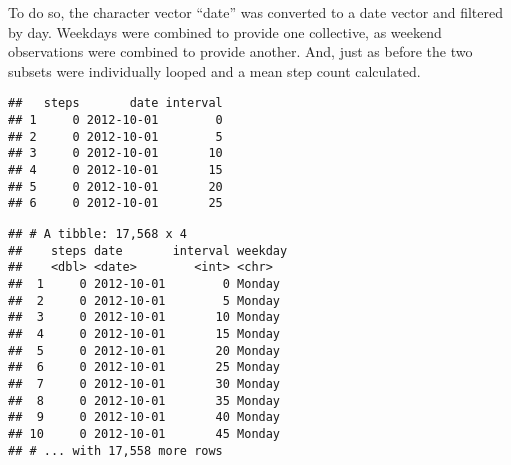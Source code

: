 \documentclass[]{article}
\newenvironment{Shaded}{\begin{snugshade}}{\end{snugshade}}
\newcommand{\KeywordTok}[1]{\textcolor[rgb]{0.13,0.29,0.53}{\textbf{#1}}}
\newcommand{\DataTypeTok}[1]{\textcolor[rgb]{0.13,0.29,0.53}{#1}}
\newcommand{\DecValTok}[1]{\textcolor[rgb]{0.00,0.00,0.81}{#1}}
\newcommand{\StringTok}[1]{\textcolor[rgb]{0.31,0.60,0.02}{#1}}
\newcommand{\OperatorTok}[1]{\textcolor[rgb]{0.81,0.36,0.00}{\textbf{#1}}}
\newcommand{\NormalTok}[1]{#1}
\begin{document}
To do so, the character vector ``date'' was converted to a date vector
and filtered by day. Weekdays were combined to provide one collective,
as weekend observations were combined to provide another. And, just as
before the two subsets were individually looped and a mean step count
calculated.

\begin{Shaded}
\end{Shaded}

\begin{verbatim}
##   steps       date interval
## 1     0 2012-10-01        0
## 2     0 2012-10-01        5
## 3     0 2012-10-01       10
## 4     0 2012-10-01       15
## 5     0 2012-10-01       20
## 6     0 2012-10-01       25
\end{verbatim}

\begin{Shaded}
\end{Shaded}

\begin{verbatim}
## # A tibble: 17,568 x 4
##    steps date       interval weekday
##    <dbl> <date>        <int> <chr>  
##  1     0 2012-10-01        0 Monday 
##  2     0 2012-10-01        5 Monday 
##  3     0 2012-10-01       10 Monday 
##  4     0 2012-10-01       15 Monday 
##  5     0 2012-10-01       20 Monday 
##  6     0 2012-10-01       25 Monday 
##  7     0 2012-10-01       30 Monday 
##  8     0 2012-10-01       35 Monday 
##  9     0 2012-10-01       40 Monday 
## 10     0 2012-10-01       45 Monday 
## # ... with 17,558 more rows
\end{verbatim}
\end{document}
